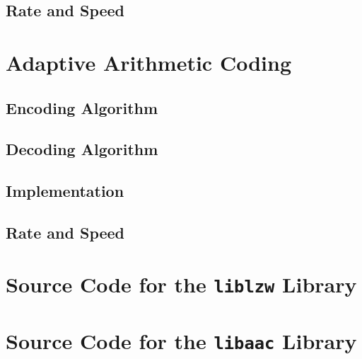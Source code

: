 \documentclass[a4paper, twocolumn]{article}
\begin{document}
        \subsection{Rate and Speed} \label{sec:lzw_rate_and_speed}

    \clearpage
    \section{Adaptive Arithmetic Coding} \label{sec:adaptive_arithmetic_coding}
        \subsection{Encoding Algorithm} \label{sec:aac_encoding_algorithm}
        \subsection{Decoding Algorithm} \label{sec:aac_decoding_algorithm}
        \subsection{Implementation} \label{sec:aac_implementation}
        \subsection{Rate and Speed} \label{sec:aac_rate_and_speed}

    \appendix \onecolumn

    \clearpage
    \section{Source Code for the \texttt{liblzw} Library} \label{sec:liblzw}

    \clearpage
    \section{Source Code for the \texttt{libaac} Library} \label{sec:libaac}
\end{document}
